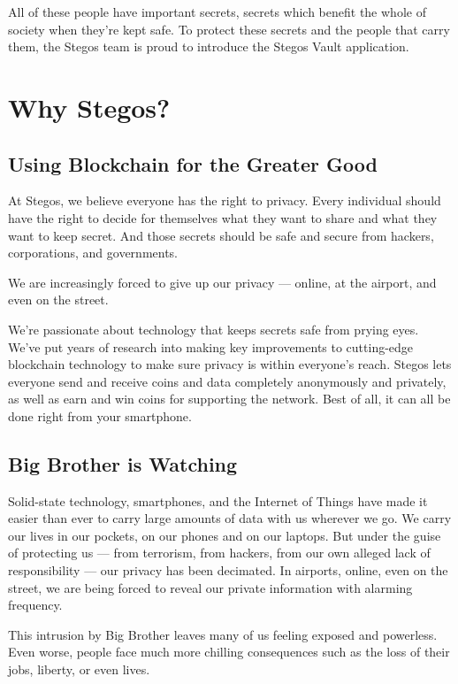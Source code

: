 \documentclass[8pt,fleqn,openany]{book}
\begin{document}
All of these people have important secrets, secrets which benefit the whole of society when they’re kept safe. To protect these secrets and the people that carry them, the Stegos team is proud to introduce the Stegos Vault application.

\chapter{Why Stegos?}\label{chap:why-stegos}

\section{Using Blockchain for the Greater Good}
At Stegos, we believe everyone has the right to privacy. Every individual should have the right to decide for themselves what they want to share and what they want to keep secret. And those secrets should be safe and secure from hackers, corporations, and governments.

We are increasingly forced to give up our privacy — online, at the airport, and even on the street. 

We're passionate about technology that keeps secrets safe from prying eyes. We’ve put years of research into making key improvements to cutting-edge blockchain technology to make sure privacy is within everyone’s reach. Stegos lets everyone send and receive coins and data completely anonymously and privately, as well as earn and win coins for supporting the network. Best of all, it can all be done right from your smartphone.

\section{Big Brother is Watching}
Solid-state technology, smartphones, and the Internet of Things have made it easier than ever to carry large amounts of data with us wherever we go. We carry our lives in our pockets, on our phones and on our laptops. But under the guise of protecting us — from terrorism, from hackers, from our own alleged lack of responsibility — our privacy has been decimated. In airports, online, even on the street, we are being forced to reveal our private information with alarming frequency.

This intrusion by Big Brother leaves many of us feeling exposed and powerless. Even worse, people face much more chilling consequences such as the loss of their jobs, liberty, or even lives.
\end{document}
